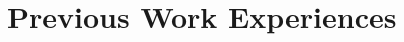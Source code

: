 \documentclass[11pt,a4paper,sans]{moderncv}
\begin{document}
\begin{comment}
\subsection{Formations doctorales}
\cvitem{Sept. 2020\\ (3 jours)}{\textbf{FAIR 2020} : ``\textcolor{blue}{\href{https://ressources.france-bioinformatique.fr/fr/evenements/principes-fair-appliques-a-la-bioinformatique}Les principes FAIR appliqués à la bioinformatique}'' \hspace{5cm} (Institut Français de Bioinformatique, IFB)\\}
\cvitem{2019\\(3 mois)}{\textbf{Pr. Walter Fontana} : ``\textcolor{blue}{\href{https://www.college-de-france.fr/site/walter-fontana/course-2019-2020.htm}{La biologie de l'information – un dialogue entre l'informatique et la biologie}}'' (Coll\`{e}ge de France)}
\cvitem{Juil. 2019\\(2 semaines)}{\textbf{RLSS 2019} : ``\textcolor{blue}{\href{https://rlss.inria.fr/}{Reinforcement Learning Summer}}'' (Inria SCOOL)}
\end{comment}

\section{Previous Work Experiences}
\end{document}
